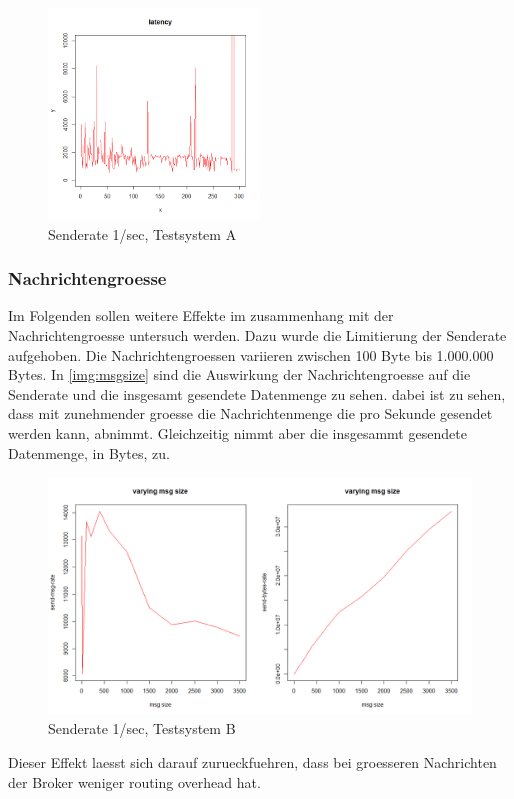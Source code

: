 \begin{figure}
\center
  \includegraphics[width=0.5\textwidth]{images/ratelimit1.png}
  \caption{Senderate 1/sec, Testsystem A}
  \label{img:senderate1-B}
\end{figure}

\subsubsection{Nachrichtengroesse}
Im Folgenden sollen weitere Effekte im zusammenhang mit der Nachrichtengroesse untersuch werden. Dazu wurde die Limitierung der Senderate aufgehoben. Die Nachrichtengroessen variieren zwischen 100 Byte bis 1.000.000 Bytes.
In \autoref{img:msgsize} sind die Auswirkung der Nachrichtengroesse auf die Senderate und die insgesamt gesendete Datenmenge zu sehen. dabei ist zu sehen, dass mit zunehmender groesse die Nachrichtenmenge die pro Sekunde gesendet werden kann, abnimmt. Gleichzeitig nimmt aber die insgesammt gesendete Datenmenge, in Bytes, zu. 
\begin{figure}
\center
  \includegraphics[width=1\textwidth]{images/msg-size.png}
  \caption{Senderate 1/sec, Testsystem B}
  \label{img:msgsize}
\end{figure}
Dieser Effekt laesst sich darauf zurueckfuehren, dass bei groesseren Nachrichten der Broker weniger routing overhead hat.

